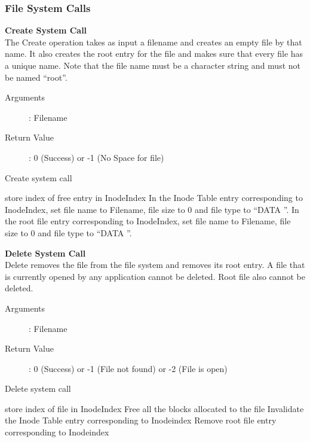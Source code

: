 \documentclass[10pt]{article}
\begin{document}
\subsubsection{File System Calls}
\textbf{Create System Call}\\
The Create operation takes as input a filename and creates an empty file by that name. It also creates the root entry for the file and makes sure that every file has a unique name. Note that the file name must be a character string and must not be named “root”.
\begin{description}
\item[Arguments]: Filename
\item[Return Value]: 0 (Success) or -1 (No Space for file)
\end{description}
\begin{algorithm}
\caption{Create system call}
\begin{algorithmic}
\ENDIF    
{}
\ELSE
    \STATE store index of free entry in InodeIndex
\ENDIF   
\STATE In the Inode Table entry corresponding to InodeIndex, set file name to Filename, file size to 0 and file type to “DATA ”.
\STATE In the root file entry corresponding to InodeIndex, set file name to Filename, file size to 0 and file type to “DATA ”.
\end{algorithmic}
\end{algorithm}
\textbf{Delete System Call}\\
Delete removes the file from the file system and removes its root entry. A file that is currently opened by any application cannot be deleted. Root file also cannot be deleted.
\begin{description}
	\item[Arguments]: Filename
	\item[Return Value]: 0 (Success) or -1 (File not found) or -2 (File is open)
\end{description} 
\begin{algorithm}
\caption{Delete system call}
\begin{algorithmic}
\ELSE
    \STATE store index of file in InodeIndex
\ENDIF    
{}
\ENDIF
\STATE Free all the blocks allocated to the file
\STATE Invalidate the Inode Table entry corresponding to Inodeindex
\STATE Remove root file entry corresponding to Inodeindex
\end{algorithmic}
\end{algorithm}
\end{document}

